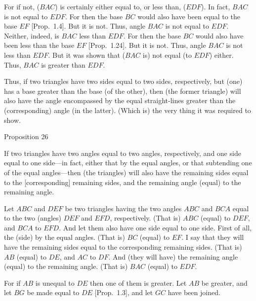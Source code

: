 For if not, ($BAC$) is certainly either equal to, or less than, ($EDF$). In fact, $BAC$ is not equal to
$EDF$. For then the base $BC$ would also have been equal to the base $EF$ [Prop.~1.4]. But it is not.
Thus, angle $BAC$ is not equal to $EDF$. Neither, indeed, is $BAC$ less
than $EDF$. For then the base $BC$ would also have been less than the base $EF$ [Prop.~1.24].
But it is not. Thus, angle $BAC$ is not less than $EDF$. But it was  shown
that ($BAC$ is) not equal (to $EDF$) either. Thus, $BAC$ is greater than $EDF$.

Thus, if two triangles have two sides equal to two sides, respectively,
but (one) has a base greater than the base (of the other), then (the former triangle) will also have the angle encompassed by the equal straight-lines greater than the (corresponding) angle (in the latter). (Which is) the
very thing it was required to show.


\begin{center}
{\large Proposition 26}
\end{center}

If  two triangles have two angles equal to two angles, respectively, 
and one side equal to one side---in fact, either that by the equal angles, or that
subtending one of the equal angles---then (the triangles) will also have the remaining
sides equal to the [corresponding] remaining sides, and the
remaining angle (equal) to the remaining angle.

Let $ABC$ and $DEF$ be two triangles having the two angles $ABC$ and
$BCA$ equal to the two (angles) $DEF$ and $EFD$, respectively.
(That is) $ABC$ (equal) to $DEF$, and $BCA$ to $EFD$. And let them also have
one side equal to one side. First of all, the (side) by the equal angles. (That is)
$BC$ (equal) to $EF$. I say that they will have the  remaining sides equal to the
corresponding remaining sides. (That is) $AB$ (equal) to $DE$, and $AC$ to
$DF$. And (they will have) the remaining angle (equal) to the remaining angle.
(That is) $BAC$ (equal) to $EDF$.

\epsfysize=1.5in
\centerline{}

For if $AB$ is unequal to $DE$ then one of them is greater. Let $AB$ be greater,
and let $BG$ be made equal to $DE$ [Prop.~1.3], and let $GC$ have been
joined.

